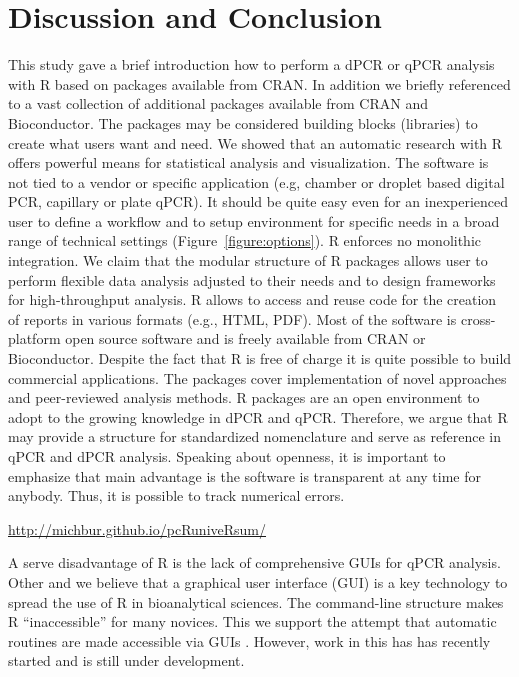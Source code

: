 \section{Discussion and Conclusion}

This study gave a brief introduction how to perform a dPCR or qPCR analysis with 
R based on packages available from CRAN. In addition we briefly referenced to a 
vast collection of additional packages available from CRAN and Bioconductor. The 
packages may be considered building blocks (libraries) to create what users want and 
need. We showed that an automatic research with R offers powerful means for 
statistical analysis and visualization. The software is not tied to a vendor or 
specific application (e.g, chamber or droplet based digital PCR, capillary or 
plate qPCR). It should be quite easy even for an inexperienced user to define a 
workflow and to setup environment for specific needs in a broad range of 
technical settings (Figure~\ref{figure:options}). R enforces no monolithic 
integration. We claim that the modular structure of R packages allows user to 
perform flexible data analysis adjusted to their needs and to design frameworks 
for high-throughput analysis. R allows to access and reuse code for the creation 
of reports in various formats (e.g., HTML, PDF). Most of the software is 
cross-platform open source software and is freely available from CRAN or 
Bioconductor. Despite the fact that R is free of charge it is quite possible to 
build commercial applications. The packages cover implementation of novel 
approaches and peer-reviewed analysis methods. R packages are an open 
environment to adopt to the growing knowledge in dPCR and qPCR. Therefore, we 
argue that R may provide a structure for standardized nomenclature and serve as 
reference in qPCR and dPCR analysis. Speaking about openness, it is important to 
emphasize that main advantage is the software is transparent at any time for 
anybody. Thus, it is possible to track numerical errors. 

\url{http://michbur.github.io/pcRuniveRsum/}

A serve disadvantage of R is the lack of comprehensive GUIs for qPCR analysis. 
Other and we believe that a graphical user interface (GUI) is a key technology 
to spread the use of R in bioanalytical sciences. The command-line structure 
makes R ``inaccessible'' for many novices. This we support the attempt that 
automatic routines are made accessible via GUIs \citep{rodiger_rkward_2012}. 
However, work in this has has recently started and is still under development.

